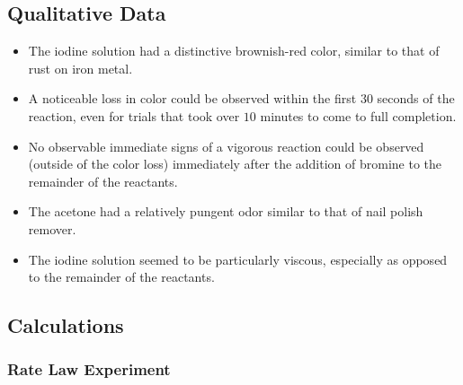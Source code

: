 \subsection{Qualitative Data}
\begin{itemize}[]
	  \item The iodine solution had a distinctive brownish-red color, similar to that of rust on iron metal.
	  \item A noticeable loss in color could be observed within the first $30$ seconds of the reaction, even for trials that took over $10$ minutes to come to full completion.
	  \item No observable immediate signs of a vigorous reaction could be observed (outside of the color loss) immediately after the addition of bromine to the remainder of the reactants.
	  \item The acetone had a relatively pungent odor similar to that of nail polish remover.
	  \item The iodine solution seemed to be particularly viscous, especially as opposed to the remainder of the reactants.
	\end{itemize}

\subsection{Calculations}

\subsubsection{Rate Law Experiment}

